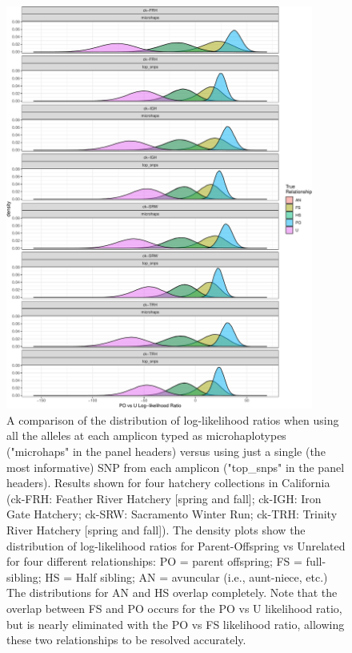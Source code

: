 \begin{figure}
\begin{center}
\includegraphics[width=0.9\textwidth]{images/cmkr-comp-figure-crop.pdf}
\end{center}
\caption[Comparison of microhaplotypes vs.~best SNP in each amplicon]{\footnotesize 
A comparison of the distribution of log-likelihood ratios when using all the alleles at each
amplicon typed as microhaplotypes ("microhaps" in the panel headers) versus using just a single (the most informative) SNP from each
amplicon ("top\_snps" in the panel headers).  Results shown for four hatchery collections in California 
(ck-FRH: Feather River Hatchery [spring and fall]; ck-IGH: Iron Gate Hatchery; ck-SRW: Sacramento Winter Run;
ck-TRH: Trinity River Hatchery [spring and fall]).  The density plots show
the distribution of log-likelihood ratios for Parent-Offspring vs Unrelated for four different relationships:
PO = parent offspring; FS = full-sibling; HS = Half sibling; AN = avuncular (i.e., aunt-niece, etc.)
The distributions for AN and HS overlap completely.  Note that the overlap between FS and PO occurs
for the PO vs U likelihood ratio, but is nearly eliminated with the PO vs FS likelihood ratio, allowing these
two relationships to be resolved accurately.}
\label{fig:ckmr-comp}
\end{figure}




